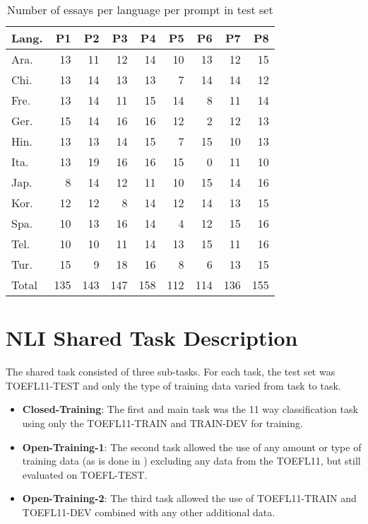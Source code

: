 \documentclass[11pt,letterpaper]{article}
\begin{document}
\begin{table*}[htb]
    \label{tab:prompts-test}
    \begin{center}
        \begin{tabular}{lrrrrrrrr}
            \hline
            \textbf{Lang.} & \textbf{P1} & \textbf{P2} & \textbf{P3} & \textbf{P4} & \textbf{P5} & \textbf{P6} & \textbf{P7} & \textbf{P8}\\ \hline
            Ara.     &   13 & 11 & 12 & 14 & 10 & 13 & 12 & 15 \\ \hline
            Chi.    &   13 & 14 & 13 & 13 & 7  & 14 & 14 & 12 \\ \hline
            Fre.     &   13 & 14 & 11 & 15 & 14 & 8  & 11 & 14 \\ \hline
            Ger.     &   15 & 14 & 16 & 16 & 12 & 2  & 12 & 13 \\ \hline
            Hin.      &   13 & 13 & 14 & 15 & 7  & 15 & 10 & 13 \\ \hline
            Ita.    &   13 & 19 & 16 & 16 & 15 & 0  & 11 & 10 \\ \hline
            Jap.   &   8  & 14 & 12 & 11 & 10 & 15 & 14 & 16 \\ \hline
            Kor.     &   12 & 12 & 8  & 14 & 12 & 14 & 13 & 15 \\ \hline
            Spa.    &   10 & 13 & 16 & 14 & 4  & 12 & 15 & 16 \\ \hline
            Tel.     &   10 & 10 & 11 & 14 & 13 & 15 & 11 & 16 \\ \hline
            Tur.    &   15 & 9  & 18 & 16 & 8  & 6  & 13 & 15 \\ \hline \hline
            Total      &   135&143 & 147& 158& 112& 114& 136& 155 \\ \hline
        \end{tabular}
    \end{center}
    \caption{Number of essays per language per prompt in test set}
\end{table*}


\section{NLI Shared Task Description}

The shared task consisted of three sub-tasks. For each task, the
test set was TOEFL11-TEST and only the type of training data varied from
task to task.  

\begin{itemize}
\item {\bf Closed-Training}:  The first and main task was the 11 way
classification task using only the TOEFL11-TRAIN and TRAIN-DEV for training.
\item {\bf Open-Training-1}: The second task allowed the use of any amount or
type of training data (as is done in \cite{brooke2011native}) excluding any data from the TOEFL11, but still evaluated on
TOEFL-TEST.
\item {\bf Open-Training-2}: The third task allowed the use of TOEFL11-TRAIN and TOEFL11-DEV combined with any other additional data.
\end{itemize}
\end{document}

